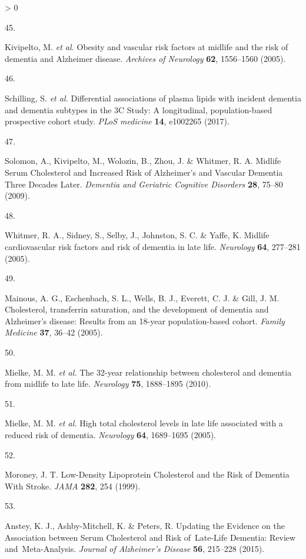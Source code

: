 \documentclass[a4paper, twoside]{templates/ociamthesis}
\newlength{\cslhangindent}
\newlength{\csllabelwidth}
\newenvironment{CSLReferences}[3] %
 {%
  \setlength{\parindent}{0pt}
  \ifodd #1 \everypar{\setlength{\hangindent}{\cslhangindent}}\ignorespaces\fi
  \ifnum #2 > 0
  \setlength{\parskip}{#2\baselineskip}
  \fi
 }%
 {}
\newcommand{\CSLLeftMargin}[1]{\parbox[t]{\maxof{\widthof{#1}}{\csllabelwidth}}{#1}}
\newcommand{\CSLRightInline}[1]{\parbox[t]{\linewidth - \csllabelwidth}{#1}}
\begin{document}
\begin{CSLReferences}{0}{0}
\leavevmode\hypertarget{ref-kivipelto2005}{}%
\CSLLeftMargin{45. }
\CSLRightInline{Kivipelto, M. \emph{et al.} Obesity and vascular risk factors at midlife and the risk of dementia and {Alzheimer} disease. \emph{Archives of Neurology} \textbf{62}, 1556--1560 (2005).}

\leavevmode\hypertarget{ref-schilling2017}{}%
\CSLLeftMargin{46. }
\CSLRightInline{Schilling, S. \emph{et al.} Differential associations of plasma lipids with incident dementia and dementia subtypes in the {3C Study}: {A} longitudinal, population-based prospective cohort study. \emph{PLoS medicine} \textbf{14}, e1002265 (2017).}

\leavevmode\hypertarget{ref-solomon2009}{}%
\CSLLeftMargin{47. }
\CSLRightInline{Solomon, A., Kivipelto, M., Wolozin, B., Zhou, J. \& Whitmer, R. A. Midlife {Serum Cholesterol} and {Increased Risk} of {Alzheimer}'s and {Vascular Dementia Three Decades Later}. \emph{Dementia and Geriatric Cognitive Disorders} \textbf{28}, 75--80 (2009).}

\leavevmode\hypertarget{ref-whitmer2005}{}%
\CSLLeftMargin{48. }
\CSLRightInline{Whitmer, R. A., Sidney, S., Selby, J., Johnston, S. C. \& Yaffe, K. Midlife cardiovascular risk factors and risk of dementia in late life. \emph{Neurology} \textbf{64}, 277--281 (2005).}

\leavevmode\hypertarget{ref-mainous2005}{}%
\CSLLeftMargin{49. }
\CSLRightInline{Mainous, A. G., Eschenbach, S. L., Wells, B. J., Everett, C. J. \& Gill, J. M. Cholesterol, transferrin saturation, and the development of dementia and {Alzheimer}'s disease: Results from an 18-year population-based cohort. \emph{Family Medicine} \textbf{37}, 36--42 (2005).}

\leavevmode\hypertarget{ref-mielke2010}{}%
\CSLLeftMargin{50. }
\CSLRightInline{Mielke, M. M. \emph{et al.} The 32-year relationship between cholesterol and dementia from midlife to late life. \emph{Neurology} \textbf{75}, 1888--1895 (2010).}

\leavevmode\hypertarget{ref-mielke2005}{}%
\CSLLeftMargin{51. }
\CSLRightInline{Mielke, M. M. \emph{et al.} High total cholesterol levels in late life associated with a reduced risk of dementia. \emph{Neurology} \textbf{64}, 1689--1695 (2005).}

\leavevmode\hypertarget{ref-moroney1999}{}%
\CSLLeftMargin{52. }
\CSLRightInline{Moroney, J. T. Low-{Density Lipoprotein Cholesterol} and the {Risk} of {Dementia With Stroke}. \emph{JAMA} \textbf{282}, 254 (1999).}

\leavevmode\hypertarget{ref-anstey2015}{}%
\CSLLeftMargin{53. }
\CSLRightInline{Anstey, K. J., Ashby-Mitchell, K. \& Peters, R. Updating the {Evidence} on the {Association} between {Serum Cholesterol} and {Risk} of~{Late}-{Life Dementia}: {Review} and~{Meta}-{Analysis}. \emph{Journal of Alzheimer's Disease} \textbf{56}, 215--228 (2015).}


\end{CSLReferences}
\end{document}
